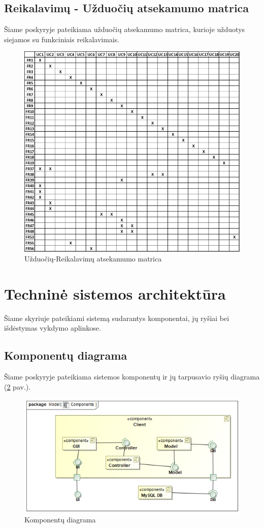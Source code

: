 \documentclass{VUMIFPSbakalaurinis}
\begin{document}
\subsection{Reikalavimų - Užduočių atsekamumo matrica}
Šiame poskyryje pateikiama užduočių atsekamumo matrica, kurioje užduotys siejamos su funkciniais reikalavimais.
\begin{figure}[H]
    \centering
    \includegraphics[scale=0.8]{img/UC-matrix}
    \caption{Užduočių-Reikalavimų atsekamumo matrica}
    \label{img:uc-matrix}
\end{figure}

\section{Techninė sistemos architektūra}
Šiame skyriuje pateikiami sistemą sudarantys komponentai, jų ryšiai bei išdėstymas vykdymo aplinkose.

\subsection{Komponentų diagrama}
Šiame poskyryje pateikiama sistemos komponentų ir jų tarpusavio ryšių diagrama (\ref {img:components} pav.).
\begin{figure}[h]
	\centering
	\includegraphics[scale=0.7]{img/Components}
	\caption{Komponentų diagrama}
	\label{img:components}
\end{figure}
\end{document}
